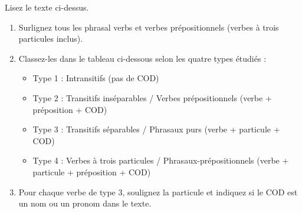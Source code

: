 \documentclass[11pt]{article}
\newcommand{\cle}[1]{{\popxbold\color{popdark}#1}}
\begin{document}
\begin{exercice}
Lisez le texte ci-dessus. 
\begin{enumerate}
    \item Surlignez tous les \cle{phrasal verbs} et \cle{verbes prépositionnels} (verbes à trois particules inclus).
    \item Classez-les dans le tableau ci-dessous selon les quatre types étudiés :
    \begin{itemize}
        \item Type 1 : Intransitifs (pas de COD)
        \item Type 2 : Transitifs inséparables / Verbes prépositionnels (verbe + préposition + COD)
        \item Type 3 : Transitifs séparables / Phrasaux purs (verbe + particule + COD)
        \item Type 4 : Verbes à trois particules / Phrasaux-prépositionnels (verbe + particule + préposition + COD)
    \end{itemize}
    \item Pour chaque verbe de type 3, soulignez la particule et indiquez si le COD est un nom ou un pronom dans le texte.
\end{enumerate}
\end{exercice}
\end{document}
